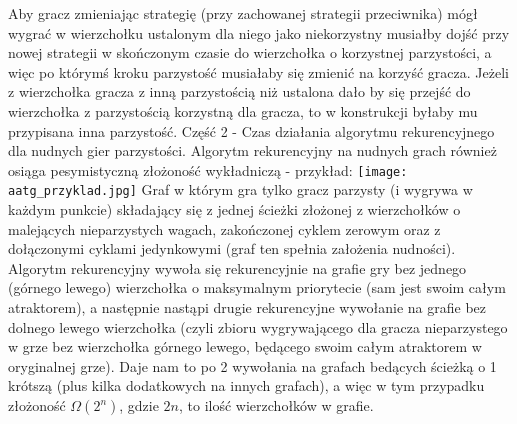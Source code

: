\documentclass{article}
\begin{document}
Aby gracz zmieniając strategię (przy zachowanej strategii przeciwnika) mógł wygrać
w wierzchołku ustalonym dla niego jako niekorzystny musiałby dojść przy nowej strategii w skończonym czasie do wierzchołka o korzystnej parzystości,
a więc po którymś kroku parzystość musiałaby się zmienić na korzyść gracza.
Jeżeli z wierzchołka gracza z inną parzystością niż ustalona dało by się przejść do wierzchołka z parzystością korzystną dla gracza,
to w konstrukcji byłaby mu przypisana inna parzystość.\newline
\newline
Część 2 - Czas działania algorytmu rekurencyjnego dla nudnych gier parzystości.\newline
\newline
Algorytm rekurencyjny na nudnych grach również osiąga pesymistyczną złożoność wykładniczą - przykład:\newline
\texttt{[image: aatg\_przyklad.jpg]}\newline
Graf w którym gra tylko gracz parzysty (i wygrywa w każdym punkcie) składający się z jednej ścieżki złożonej z wierzchołków o malejących nieparzystych wagach,
zakończonej cyklem zerowym oraz z dołączonymi cyklami jedynkowymi (graf ten spełnia założenia nudności).\newline
Algorytm rekurencyjny wywoła się rekurencyjnie na grafie gry bez jednego (górnego lewego) wierzchołka o maksymalnym priorytecie
(sam jest swoim całym atraktorem), a następnie nastąpi drugie rekurencyjne wywołanie na grafie bez dolnego lewego wierzchołka
(czyli zbioru wygrywającego dla gracza nieparzystego w grze bez wierzchołka górnego lewego, będącego swoim całym atraktorem w oryginalnej grze).
Daje nam to po 2 wywołania na grafach bedących ścieżką o 1 krótszą (plus kilka dodatkowych na innych grafach), a więc w tym przypadku złożoność $\Omega(2^n)$, gdzie $2n$,
to ilość wierzchołków w grafie.
\end{document}
